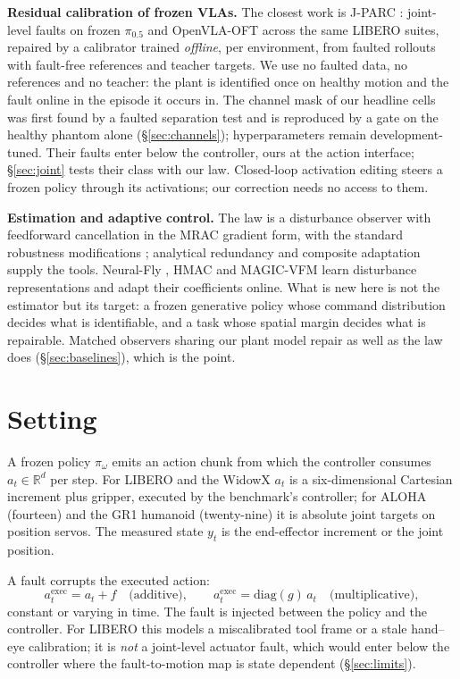 \documentclass{article}
\begin{document}
\textbf{Residual calibration of frozen VLAs.} The closest work is J-PARC \citep{jparc2026}:
joint-level faults on frozen $\pi_{0.5}$ and OpenVLA-OFT across the same LIBERO suites,
repaired by a calibrator trained \emph{offline}, per environment, from faulted rollouts with
fault-free references and teacher targets. We use no faulted data, no references and no
teacher: the plant is identified once on healthy motion and the fault online in the episode
it occurs in. The channel mask of our headline cells was first found by a faulted separation
test and is reproduced by a gate on the healthy phantom alone (\S\ref{sec:channels});
hyperparameters remain development-tuned. Their faults enter below the controller, ours at
the action interface; \S\ref{sec:joint} tests their class with our law. Closed-loop
activation editing \citep{clae2026} steers a frozen policy through its activations; our
correction needs no access to them.

\textbf{Estimation and adaptive control.} The law is a disturbance observer
\citep{shim2021dob} with feedforward cancellation in the MRAC gradient form, with the
standard robustness modifications \citep{ioannou1996}; analytical redundancy
\citep{isermann2005,chen1999fdi} and composite adaptation \citep{slotine1989composite}
supply the tools. Neural-Fly \citep{neuralfly}, HMAC \citep{hmac2024} and MAGIC-VFM
\citep{magicvfm} learn disturbance representations and adapt their coefficients online. What
is new here is not the estimator but its target: a frozen generative policy whose command
distribution decides what is identifiable, and a task whose spatial margin decides what is
repairable. Matched observers sharing our plant model repair as well as the law does
(\S\ref{sec:baselines}), which is the point.

\section{Setting}
\label{sec:setting}

A frozen policy $\pi_\omega$ emits an action chunk from which the controller consumes
$a_t\in\mathbb{R}^d$ per step. For LIBERO and the WidowX $a_t$ is a six-dimensional
Cartesian increment plus gripper, executed by the benchmark's controller; for ALOHA (fourteen) and
the GR1 humanoid (twenty-nine) it is absolute joint targets on position servos. The measured state $y_t$ is the end-effector increment or the joint position.

A fault corrupts the executed action:
\[
a^{\mathrm{exec}}_t = a_t + f \quad\text{(additive)},\qquad
a^{\mathrm{exec}}_t = \mathrm{diag}(g)\,a_t \quad\text{(multiplicative)},
\]
constant or varying in time. The fault is injected between the policy and the controller.
For LIBERO this models a miscalibrated tool frame or a stale hand--eye calibration; it is
\emph{not} a joint-level actuator fault, which would enter below the controller where the
fault-to-motion map is state dependent (\S\ref{sec:limits}).
\end{document}
